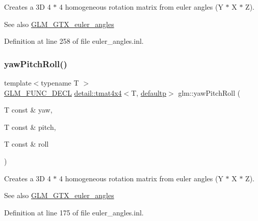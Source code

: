 Creates a 3D 4 $\ast$ 4 homogeneous rotation matrix from euler angles (Y $\ast$ X $\ast$ Z). \begin{DoxySeeAlso}{See also}
\hyperlink{group__gtx__euler__angles}{G\+L\+M\+\_\+\+G\+T\+X\+\_\+euler\+\_\+angles} 
\end{DoxySeeAlso}


Definition at line 258 of file euler\+\_\+angles.\+inl.

\mbox{\label{group__gtx__euler__angles_gaf6f927d06835272cd6a61ee3f8f65f5e}} 
\subsubsection{\texorpdfstring{yaw\+Pitch\+Roll()}{yawPitchRoll()}}
{\footnotesize\ttfamily template$<$typename T $>$ \\
\hyperlink{setup_8hpp_ab2d052de21a70539923e9bcbf6e83a51}{G\+L\+M\+\_\+\+F\+U\+N\+C\+\_\+\+D\+E\+CL} \hyperlink{structglm_1_1detail_1_1tmat4x4}{detail\+::tmat4x4}$<$T, \hyperlink{namespaceglm_a0f04f086094c747d227af4425893f545a9d21ccd8b5a009ec7eb7677befc3bf51}{defaultp}$>$ glm\+::yaw\+Pitch\+Roll (\begin{DoxyParamCaption}\item[{T const \&}]{yaw,  }\item[{T const \&}]{pitch,  }\item[{T const \&}]{roll }\end{DoxyParamCaption})}

Creates a 3D 4 $\ast$ 4 homogeneous rotation matrix from euler angles (Y $\ast$ X $\ast$ Z). \begin{DoxySeeAlso}{See also}
\hyperlink{group__gtx__euler__angles}{G\+L\+M\+\_\+\+G\+T\+X\+\_\+euler\+\_\+angles} 
\end{DoxySeeAlso}


Definition at line 175 of file euler\+\_\+angles.\+inl.

